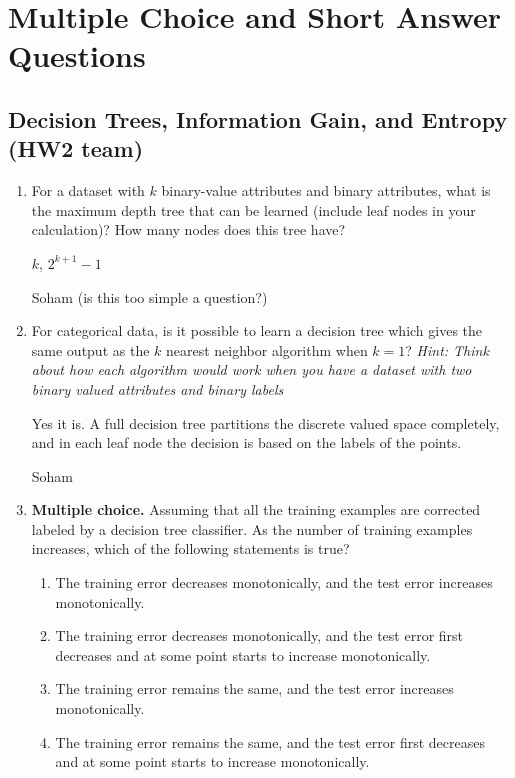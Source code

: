 \section{Multiple Choice and Short Answer Questions}

\subsection{Decision Trees, Information Gain, and Entropy (HW2 team)}

\begin{enumerate}

    
    \item For a dataset with $k$ binary-value attributes and binary attributes, what is the maximum depth tree that can be learned (include leaf nodes in your calculation)? How many nodes does this tree have?
    
    \begin{soln}
        $k$, $2^{k+1}-1$
    \end{soln}
    
    \begin{qauthor}
    Soham (is this too simple a question?)
    \end{qauthor}

    \item For categorical data, is it possible to learn a decision tree which gives the same output as the $k$ nearest neighbor algorithm when $k = 1$? \textit{Hint: Think about how each algorithm would work when you have a dataset with two binary valued attributes and binary labels}
    
    \begin{soln}
    Yes it is. A full decision tree partitions the discrete valued space completely, and in each leaf node the decision is based on the labels of the points.
    \end{soln}
    
    \begin{qauthor}
    Soham
    \end{qauthor}
    
    \item{} \textbf{Multiple choice.} Assuming that all the training examples are corrected labeled by a decision tree classifier. As the number of training examples increases, which of the following statements is true?
    \begin{enumerate}
    \item The training error decreases monotonically, and the test error increases monotonically. 
    \item The training error decreases monotonically, and the test error first decreases and at some point starts to increase monotonically. 
    \item The training error remains the same, and the test error increases monotonically. 
    \item The training error remains the same, and the test error first decreases and at some point starts to increase monotonically. 
    \end{enumerate}
    

\end{enumerate}
